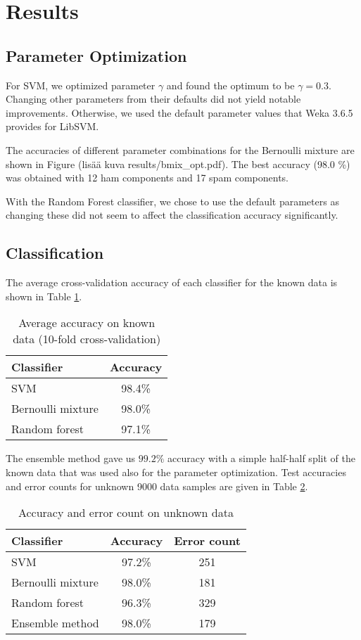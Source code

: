 \section{Results}

\subsection{Parameter Optimization}

For SVM, we optimized parameter $\gamma$ and found the optimum to be
$\gamma = 0.3$. Changing other parameters from their defaults did not
yield notable improvements. Otherwise, we used the default parameter
values that Weka 3.6.5 provides for LibSVM.

The accuracies of different parameter combinations for the Bernoulli
mixture are shown in Figure (lisää kuva results/bmix\_opt.pdf). The best
accuracy (98.0 \%) was obtained with 12 ham components and 17 spam
components.

With the Random Forest classifier, we chose to use the default
parameters as changing these did not seem to affect the classification
accuracy significantly.

\subsection{Classification}

The average cross-validation accuracy of each classifier for the known
data is shown in Table \ref{results1k}.

\begin{table}[H]
\caption{Average accuracy on known data (10-fold cross-validation)}
\label{results1k}
\begin{tabular}{l|c}
Classifier & Accuracy \\ \hline
SVM & 98.4\% \\
Bernoulli mixture & 98.0\% \\
Random forest & 97.1\% \\
\end{tabular}
\end{table}

The ensemble method gave us $99.2 \%$ accuracy with a simple half-half
split of the known data that was used also for the parameter
optimization. Test accuracies and error counts for unknown 9000 data
samples are given in Table \ref{results9k}.

\begin{table}
\caption{Accuracy and error count on unknown data}
\label{results9k}
\begin{tabular}{l|c|c}
Classifier & Accuracy & Error count \\ \hline
SVM & 97.2\% & 251 \\
Bernoulli mixture & 98.0\% & 181 \\
Random forest & 96.3\% & 329 \\ \hline
Ensemble method & 98.0\% & 179 \\
\end{tabular}
\end{table}
